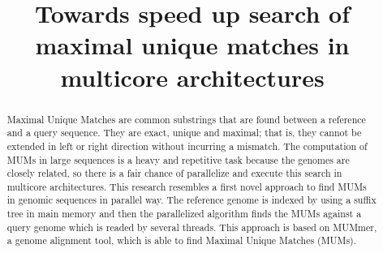 \documentclass[3p,times]{elsarticle}
\begin{document}
\begin{frontmatter}




\title{Towards speed up search of maximal unique matches in multicore architectures}


\author{}

\address{}

\begin{abstract}
  Maximal Unique Matches are common substrings that are found between a reference and a query sequence. They are exact, unique and maximal; that is, they cannot be extended in left or right direction without incurring a mismatch. The computation of MUMs in large sequences is a heavy and repetitive task because the genomes are closely related, so there is a fair chance of parallelize and execute this search in multicore architectures. This research resembles a first novel approach to find MUMs in genomic sequences in parallel way. The reference genome is indexed by using a suffix tree in main memory and then the parallelized algorithm finds the MUMs against a query genome which is readed by several threads. This approach is based on MUMmer, a genome alignment tool, which is able to find Maximal Unique Matches (MUMs). 
\end{abstract}

\begin{keyword}



\end{keyword}

\end{frontmatter}
\end{document}

